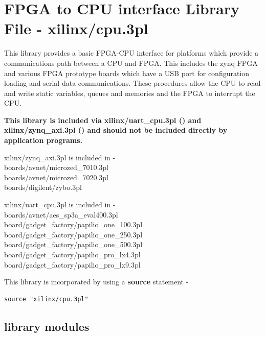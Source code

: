 


\section{FPGA to CPU interface Library File - xilinx/cpu.3pl}
\label{chap:lmxilcpulib}

    This library provides a basic FPGA-CPU interface for platforms which provide
    a communications path between a CPU and FPGA. This includes the zynq FPGA
    and various FPGA prototype boards which have a USB port for configuration
    loading and serial data communications. These procedures allow the CPU to
    read and write static variables, queues and memories and the FPGA to
    interrupt the CPU.
    
    {\bf This library is included via xilinx/uart\_cpu.3pl
    () and xilinx/zynq\_axi.3pl
    () and should not be included directly by
    application programs.}
    
    xilinx/zynq\_axi.3pl is included in -\\
    boards/avnet/microzed\_7010.3pl\\
    boards/avnet/microzed\_7020.3pl\\
    boards/digilent/zybo.3pl
    
    xilinx/uart\_cpu.3pl is included in -\\
    boards/avnet/aes\_sp3a\_eval400.3pl\\
    board/gadget\_factory/papilio\_one\_100.3pl\\
    board/gadget\_factory/papilio\_one\_250.3pl\\
    board/gadget\_factory/papilio\_one\_500.3pl\\
    board/gadget\_factory/papilio\_pro\_lx4.3pl\\
    board/gadget\_factory/papilio\_pro\_lx9.3pl
    
    This library is incorporated by using a {\bf source} statement -
    \begin{lstlisting}[gobble=4, language=threepl]
       source "xilinx/cpu.3pl"
    \end{lstlisting}
    



    \subsection{library modules}
    


